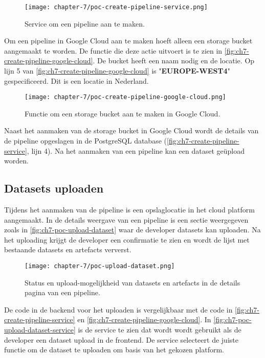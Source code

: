 \newpage

\begin{figure}[hbt!]
  \centering
  \texttt{[image: chapter-7/poc-create-pipeline-service.png]}
  \caption{Service om een pipeline aan te maken.}
  \label{fig:ch7-create-pipeline-service}
\end{figure}

Om een pipeline in Google Cloud aan te maken hoeft alleen een storage bucket aangemaakt te worden. De functie die deze actie uitvoert is te zien in \autoref{fig:ch7-create-pipeline-google-cloud}. De bucket heeft een naam nodig en de locatie. Op lijn 5 van \autoref{fig:ch7-create-pipeline-google-cloud} is \string"\textbf{EUROPE-WEST4}\string" gespecificeerd. Dit is een locatie in Nederland.

\begin{figure}[hbt!]
  \centering
  \texttt{[image: chapter-7/poc-create-pipeline-google-cloud.png]}
  \caption{Functie om een storage bucket aan te maken in Google Cloud.}
  \label{fig:ch7-create-pipeline-google-cloud}
\end{figure}

Naast het aanmaken van de storage bucket in Google Cloud wordt de details van de pipeline opgeslagen in de PostgreSQL database (\autoref{fig:ch7-create-pipeline-service}, lijn 4). Na het aanmaken van een pipeline kan een dataset geüpload worden.

\subsection{Datasets uploaden}\label{subsec:ch7-datasets-uploaden}
Tijdens het aanmaken van de pipeline is een opslaglocatie in het cloud platform aangemaakt. In de details weergave van een pipeline is een sectie weergegeven zoals in \autoref{fig:ch7-poc-upload-dataset} waar de developer datasets kan uploaden. Na het uploading krijgt de developer een confirmatie te zien en wordt de lijst met bestaande datasets en artefacts ververst.

\newpage

\begin{figure}[hbt!]
  \centering
  \texttt{[image: chapter-7/poc-upload-dataset.png]}
  \caption{Status en upload-mogelijkheid van datasets en artefacts in de details pagina van een pipeline.}
  \label{fig:ch7-poc-upload-dataset}
\end{figure}

De code in de backend voor het uploaden is vergelijkbaar met de code in \autoref{fig:ch7-create-pipeline-service} en \autoref{fig:ch7-create-pipeline-google-cloud}. In \autoref{fig:ch7-poc-upload-dataset-service} is de service te zien dat wordt wordt gebruikt als de developer een dataset upload in de frontend. De service selecteert de juiste functie om de dataset te uploaden om basis van het gekozen platform.

